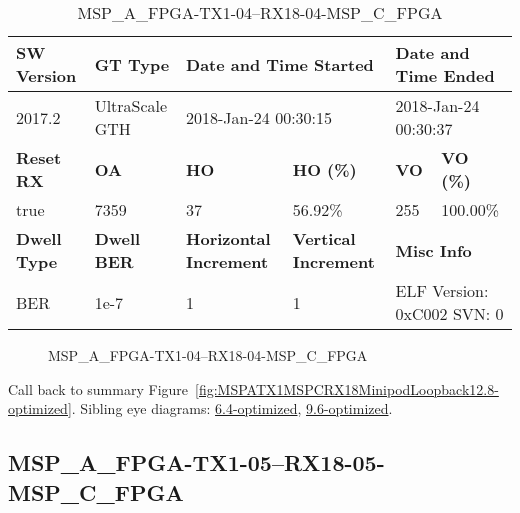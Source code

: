 \begin{table}[h]
\centering
\caption{MSP\_A\_FPGA-TX1-04--RX18-04-MSP\_C\_FPGA}
\label{tab:MSPAFPGATX104RX1804MSPCFPGA12.8-optimized}
\begin{tabular}{@{}|l|l|l|l|l|l|@{}}
\toprule
\textbf{SW Version}                & \textbf{GT Type}   & \multicolumn{2}{l|}{\textbf{Date and Time Started}}            & \multicolumn{2}{l|}{\textbf{Date and Time Ended}}        \\ \midrule
2017.2                       & UltraScale GTH          & \multicolumn{2}{l|}{2018-Jan-24 00:30:15}                   & \multicolumn{2}{l|}{2018-Jan-24 00:30:37}               \\ \midrule
\textbf{Reset RX}                  & \textbf{OA} & \textbf{HO}   & \textbf{HO (\%)} & \textbf{VO} & \textbf{VO (\%)} \\ \midrule
true & 7359        & 37          & 56.92\%        & 255        & 100.00\%       \\ \midrule
\textbf{Dwell Type}                & \textbf{Dwell BER} & \textbf{Horizontal Increment} & \textbf{Vertical Increment}    & \multicolumn{2}{l|}{\textbf{Misc Info}}                  \\ \midrule
BER                            & 1e-7        & 1        & 1           & \multicolumn{2}{l|}{ELF Version: 0xC002 SVN: 0}                         \\ \bottomrule
\end{tabular}
\end{table}

\begin{figure}[h]
\caption{MSP\_A\_FPGA-TX1-04--RX18-04-MSP\_C\_FPGA} \label{fig:MSPAFPGATX104RX1804MSPCFPGA12.8-optimized}
\end{figure}

Call back to summary Figure~\ref{fig:MSPATX1MSPCRX18MinipodLoopback12.8-optimized}.
Sibling eye diagrams: \hyperref[sec:MSPAFPGATX104RX1804MSPCFPGA6.4-optimized]{6.4-optimized}, \hyperref[sec:MSPAFPGATX104RX1804MSPCFPGA9.6-optimized]{9.6-optimized}.

\clearpage
\newpage


\subsection{MSP\_A\_FPGA-TX1-05--RX18-05-MSP\_C\_FPGA}\label{sec:MSPAFPGATX105RX1805MSPCFPGA12.8-optimized}

